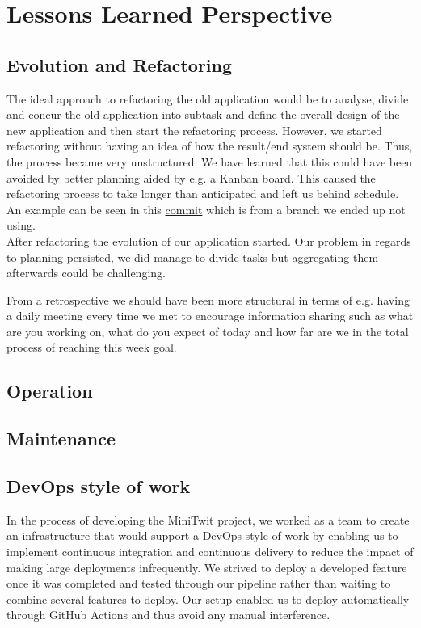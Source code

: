 \section{Lessons Learned Perspective}

\subsection{Evolution and Refactoring}
The ideal approach to refactoring the old application would be to analyse, divide and concur the old application into 
subtask and define the overall design of the new application and then start the refactoring process. However, we started
refactoring without having an idea of how the result/end system should be. Thus, the process became very unstructured. 
We have learned that this could have been avoided by better planning aided by e.g. a Kanban board. This caused the 
refactoring process to take longer than anticipated and left us behind schedule. An example can be seen in this
\href{https://github.com/organizationGB/DevOps/commit/7bbccc97d6d69e90724b00e93e92334210490085}{commit} which is from a 
branch we ended up not using. \\

After refactoring the evolution of our application started. Our problem in regards to planning persisted, we did manage
to divide tasks but aggregating them afterwards could be challenging.  

From a retrospective we should have been more structural in terms of e.g. having a daily meeting every time we met to encourage 
information sharing such as what are you working on, what do you expect of today and how far are we in the total process
of reaching this week goal.


\subsection{Operation}

\subsection{Maintenance}

\subsection{DevOps style of work}
In the process of developing the MiniTwit project, we worked as a team to create an infrastructure that would support a DevOps style of work by enabling us 
to implement continuous integration and continuous delivery to reduce the impact of making large deployments infrequently. We strived to deploy a developed 
feature once it was completed and tested through our pipeline rather than waiting to combine several features to deploy. Our setup enabled us to deploy automatically
through GitHub Actions and thus avoid any manual interference.